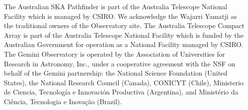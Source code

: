 \documentclass[twocolumn]{aastex63}
\begin{document}
The Australian SKA Pathfinder is part of the Australia Telescope National Facility which is managed by CSIRO. We acknowledge the Wajarri Yamatji as the traditional owners of the Observatory site. The Australia Telescope Compact Array is part of the Australia Telescope National Facility which is funded by the Australian Government for operation as a National Facility managed by CSIRO. The Gemini Observatory is operated by the Association of Universities for Research in Astronomy, Inc., under a cooperative agreement with the NSF on behalf of the Gemini partnership: the National Science Foundation (United States), the National Research Council (Canada), CONICYT (Chile), Ministerio de Ciencia, Tecnolog\'{i}a e Innovaci\'{o}n Productiva (Argentina), and Minist\'{e}rio da Ci\^{e}ncia, Tecnologia e Inova\c{c}\~{a}o (Brazil). 

%





\end{document}
